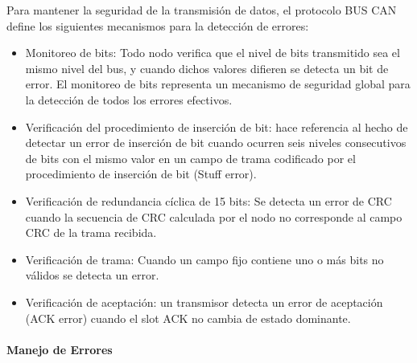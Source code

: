Para mantener la seguridad de la transmisión de datos, el protocolo BUS CAN define los siguientes mecanismos para la detección de errores: 
\begin{itemize}
\item Monitoreo de bits: Todo nodo verifica que el nivel de bits transmitido sea el mismo nivel del bus, y cuando dichos valores difieren se detecta un bit de error. El monitoreo de bits representa un mecanismo de seguridad global para la detección de todos los errores efectivos.
\item Verificación del procedimiento de inserción de bit: hace referencia al hecho de detectar un error de inserción de bit cuando ocurren seis niveles consecutivos de bits con el mismo valor en un campo de trama codificado por el procedimiento de inserción de bit (Stuff error).
\item Verificación de redundancia cíclica de 15 bits: Se detecta un error de CRC cuando la secuencia de CRC calculada por el nodo no corresponde al campo CRC de la trama recibida.
\item Verificación de trama: Cuando un campo fijo contiene uno o más bits no válidos se detecta un error. 
\item Verificación de aceptación: un transmisor detecta un error de aceptación (ACK error) cuando el slot ACK no cambia de estado dominante.
\end{itemize}


\paragraph*{Manejo de Errores}

